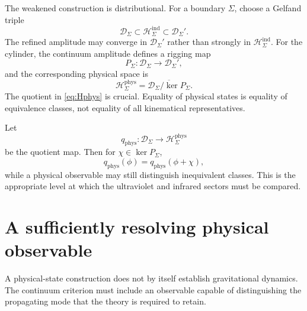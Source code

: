 \documentclass[aps,prd,reprint,nofootinbib,superscriptaddress]{revtex4-2}
\newcommand{\phys}{\mathrm{phys}}
\begin{document}
The weakened construction is distributional. For a boundary $\Sigma$, choose a Gelfand triple
\begin{equation}
\mathcal D_\Sigma
\subset
\mathcal H_\Sigma^{\mathrm{ind}}
\subset
\mathcal D_\Sigma'.
\label{eq:gelfand}
\end{equation}
The refined amplitude may converge in $\mathcal D_\Sigma'$ rather than strongly in $\mathcal H_\Sigma^{\mathrm{ind}}$. For the cylinder, the continuum amplitude defines a rigging map
\begin{equation}
P_\Sigma:\mathcal D_\Sigma\longrightarrow\mathcal D_\Sigma',
\label{eq:rigging}
\end{equation}
and the corresponding physical space is
\begin{equation}
\boxed{
\mathcal H_\Sigma^{\phys}
=
\overline{\mathcal D_\Sigma/\ker P_\Sigma}.
}
\label{eq:Hphys}
\end{equation}
The quotient in \eqref{eq:Hphys} is crucial. Equality of physical states is equality of equivalence classes, not equality of all kinematical representatives.

Let
\begin{equation}
q_{\phys}:\mathcal D_\Sigma\to\mathcal H_\Sigma^{\phys}
\end{equation}
be the quotient map. Then for $\chi\in\ker P_\Sigma$,
\begin{equation}
q_{\phys}(\phi)=q_{\phys}(\phi+\chi),
\label{eq:quotienteq}
\end{equation}
while a physical observable may still distinguish inequivalent classes. This is the appropriate level at which the ultraviolet and infrared sectors must be compared.

\section{A sufficiently resolving physical observable}
\label{sec:spin2}

A physical-state construction does not by itself establish gravitational dynamics. The continuum criterion must include an observable capable of distinguishing the propagating mode that the theory is required to retain.
\end{document}
